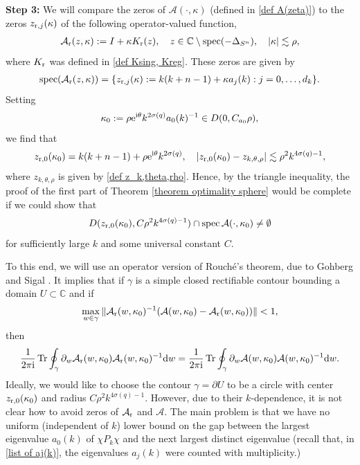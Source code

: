 \documentclass[12pt]{amsart}
\newcommand{\rd}{{\rm d}}
\newcommand{\e}{{\rm e}}
\newcommand{\C}{{\mathbb C}}
\newcommand\I{\mathrm{i}}
\DeclareMathOperator{\Tr}{Tr}
\DeclareMathOperator{\spec}{spec}
\begin{document}
\textbf{Step 3:}
We will compare the zeros of $\mathcal{A}(\cdot,\kappa)$ (defined in \eqref{def A(zeta)}) to the zeros $z_{{\rm r},j}(\kappa)$ of 
the following operator-valued function,
\begin{align}\label{def. Asing}
    \mathcal{A}_{\rm r}(z,\kappa):=I+\kappa K_{\rm r}(z),\quad z\in\C\setminus\spec(-\Delta_{S^n}),\quad|\kappa|\lesssim\rho,
\end{align}
where $K_{\rm r}$ was defined in \eqref{def Ksing, Kreg}.
These zeros are given by 
\begin{align}\label{z_rj}
    \spec(\mathcal{A}_{\rm r}(z,\kappa))=\{z_{{\rm r},j}(\kappa):=k(k+n-1)+\kappa a_{j}(k): j=0,\ldots,d_k\}.
\end{align}
Setting 
\begin{align}\label{def. kappa_0}
\kappa_{0}:=\rho \e^{\I\theta} k^{2\sigma(q)}a_0(k)^{-1}\in D(0,C_{a_0}\rho),
\end{align}
we find that 
\begin{align}\label{z_r0(kappa_r)}
    z_{{\rm r},0}(\kappa_{0})=k(k+n-1)+\rho\e^{\I\theta}k^{2\sigma(q)},\quad |z_{{\rm r},0}(\kappa_{0})-z_{k,\theta,\rho}|\lesssim \rho^2 k^{4\sigma(q)-1},
\end{align}
where $z_{k,\theta,\rho}$ is given by \eqref{def z_k,theta,rho}.
Hence, by the triangle inequality, the proof of the first part of Theorem \ref{theorem optimality sphere} would be complete if we could show that
\begin{align}\label{zero z of A near zthetarho}
    D(z_{{\rm r},0}(\kappa_{0}),C\rho^2 k^{4\sigma(q)-1})\cap\spec{\mathcal{A}(\cdot,\kappa_{0})}\neq \emptyset
\end{align}
for sufficiently large $k$ and some universal constant $C$.

To this end, we will use an operator version of Rouché’s theorem, due to Gohberg and Sigal \cite[Theorem 2.2]{MR313856}. It implies that if $\gamma$ is a simple closed rectifiable contour bounding a domain $U\subset \C$ and if
\begin{align}\label{smallness condition in Rouche}
\max_{w\in\gamma}\|\mathcal{A}_{\rm r}(w,\kappa_{0})^{-1}(\mathcal{A}(w,\kappa_{0})-\mathcal{A}_{\rm r}(w,\kappa_{0}))\|<1,
    \end{align}
then
    \begin{align}\label{traces equal}
        \frac{1}{2\pi\I}\Tr\oint_{\gamma}\partial_w \mathcal{A}_{\rm r}(w,\kappa_{0}) \mathcal{A}_{\rm r}(w,\kappa_{0})^{-1}\rd w
        =\frac{1}{2\pi\I}\Tr\oint_{\gamma}\partial_w \mathcal{A}(w,\kappa_{0}) \mathcal{A}(w,\kappa_{0})^{-1}\rd w.
    \end{align}
Ideally, we would like to choose the contour $\gamma=\partial U$ to be a circle with center $z_{{\rm r},0}(\kappa_{0})$ and radius $C\rho^2 k^{4\sigma(q)-1}$. However, due to their $k$-dependence, it is not clear how to avoid zeros of $\mathcal{A}_{\rm r}$ and $\mathcal{A}$. The main problem is that we have no uniform (independent of $k$) lower bound on the gap between the largest eigenvalue $a_0(k)$ of $\chi P_k\chi$ and the next largest distinct eigenvalue (recall that, in \eqref{list of aj(k)}, the eigenvalues $a_j(k)$ were counted with multiplicity.)
\end{document}
